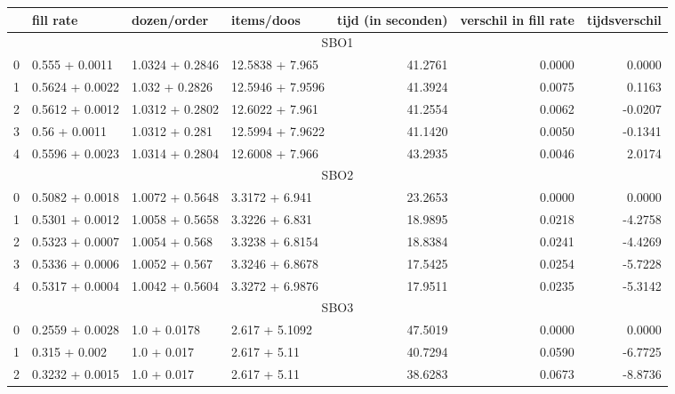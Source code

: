 \begin{tabular}{llllrrr}
\toprule
{} &        fill rate &      dozen/order &       items/doos &  tijd (in seconden) &  verschil in fill rate &  tijdsverschil \\
\midrule
\multicolumn{7}{c}{SBO1} \\
\midrule
0 &   0.555 + 0.0011 &  1.0324 + 0.2846 &   12.5838 + 7.965 &             41.2761 &                 0.0000 &         0.0000 \\
1 &  0.5624 + 0.0022 &   1.032 + 0.2826 &  12.5946 + 7.9596 &             41.3924 &                 0.0075 &         0.1163 \\
2 &  0.5612 + 0.0012 &  1.0312 + 0.2802 &   12.6022 + 7.961 &             41.2554 &                 0.0062 &        -0.0207 \\
3 &    0.56 + 0.0011 &   1.0312 + 0.281 &  12.5994 + 7.9622 &             41.1420 &                 0.0050 &        -0.1341 \\
4 &  0.5596 + 0.0023 &  1.0314 + 0.2804 &   12.6008 + 7.966 &             43.2935 &                 0.0046 &         2.0174 \\
\midrule
\multicolumn{7}{c}{SBO2} \\
\midrule
0 &  0.5082 + 0.0018 &  1.0072 + 0.5648 &   3.3172 + 6.941 &             23.2653 &                 0.0000 &         0.0000 \\
1 &  0.5301 + 0.0012 &  1.0058 + 0.5658 &   3.3226 + 6.831 &             18.9895 &                 0.0218 &        -4.2758 \\
2 &  0.5323 + 0.0007 &   1.0054 + 0.568 &  3.3238 + 6.8154 &             18.8384 &                 0.0241 &        -4.4269 \\
3 &  0.5336 + 0.0006 &   1.0052 + 0.567 &  3.3246 + 6.8678 &             17.5425 &                 0.0254 &        -5.7228 \\
4 &  0.5317 + 0.0004 &  1.0042 + 0.5604 &  3.3272 + 6.9876 &             17.9511 &                 0.0235 &        -5.3142 \\
\midrule
\multicolumn{7}{c}{SBO3} \\
\midrule
0 &  0.2559 + 0.0028 &  1.0 + 0.0178 &  2.617 + 5.1092 &             47.5019 &                 0.0000 &         0.0000 \\
1 &    0.315 + 0.002 &   1.0 + 0.017 &    2.617 + 5.11 &             40.7294 &                 0.0590 &        -6.7725 \\
2 &  0.3232 + 0.0015 &   1.0 + 0.017 &    2.617 + 5.11 &             38.6283 &                 0.0673 &        -8.8736 \\

\end{tabular}
